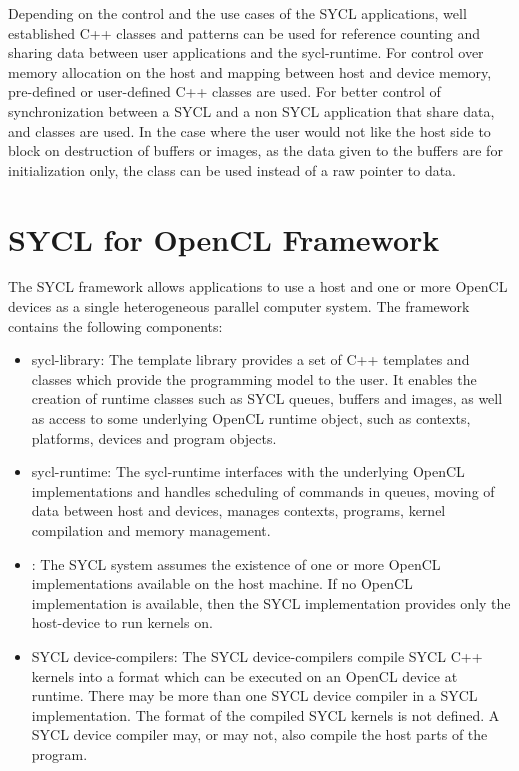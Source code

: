 Depending on the control and the use cases of the SYCL applications,
well established C++ classes and patterns can be used for reference counting and
sharing data between user applications and the \gls{sycl-runtime}. For control over
memory allocation on the host and mapping between host and device memory, pre-defined or user-defined C++
 classes are used. For better control of synchronization between a SYCL and a non
SYCL application  that share data,  and 
classes are used. In the case where the user would not like the host side to
block on destruction of buffers or images, as the data given to the buffers are
for initialization only, the  class can be used instead of a
raw pointer to data.

\section{SYCL for OpenCL Framework} 

The SYCL framework allows applications to
use a host and one or more OpenCL devices as a single heterogeneous parallel
computer system. The framework contains the following components:
\begin{itemize}
  \item
    \gls{sycl-library}: The template library provides a
    set of C++ templates and classes which provide the programming model to the
    user. It enables the creation of runtime classes such as SYCL queues,
    buffers and images, as well as access to some underlying OpenCL
    runtime object, such as contexts, platforms, devices and program objects.

  \item 
    \gls{sycl-runtime}: The \gls{sycl-runtime} interfaces with the underlying
    OpenCL implementations and handles scheduling of commands in queues, moving of
    data between host and devices, manages contexts, programs, kernel compilation
    and memory management.

   \item 
     : The SYCL system assumes the existence
     of one or more OpenCL implementations available on the host machine. If no
     OpenCL implementation is available, then the SYCL implementation provides only
     the \gls{host-device} to run kernels on. 
   \item
      SYCL \glspl{device-compiler}: The SYCL \glspl{device-compiler} compile SYCL C++
       kernels into a format which can be executed on an OpenCL device at runtime.
       There may be more than one SYCL device compiler in a SYCL implementation. The
       format of the compiled SYCL kernels is not defined.  A SYCL device compiler may,
       or may not, also compile the host parts of the program.
\end{itemize}

